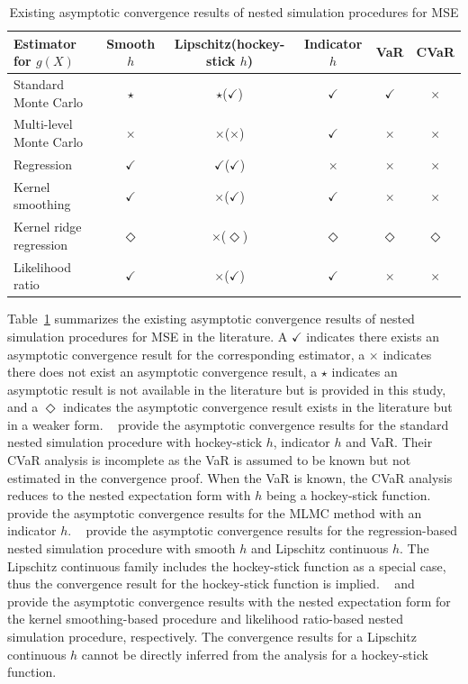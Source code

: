\begin{table}[ht]
    \centering
    \footnotesize
    \begin{tabular}{|l|c|c|c|c|c|}
    \hline
    \textbf{Estimator for} $g(X)$ & \textbf{Smooth} $h$ & \textbf{Lipschitz}(\textbf{hockey-stick} $h$) & \textbf{Indicator} $h$ & \textbf{VaR} & \textbf{CVaR} \\
    \hline
    Standard Monte Carlo & $\star$ & $\star$($\checkmark$) & $\checkmark$ & $\checkmark$ & $\times$ \\
    \hline
    Multi-level Monte Carlo & $\times$ & $\times$($\times$) & $\checkmark$ & $\times$ & $\times$ \\
    \hline
    Regression & $\checkmark$ & $\checkmark$($\checkmark$) & $\times$ & $\times$ & $\times$ \\
    \hline
    Kernel smoothing & $\checkmark$ & $\times$($\checkmark$) & $\checkmark$ & $\times$ & $\times$ \\
    \hline
    Kernel ridge regression & $\Diamond$ & $\times$($\Diamond$) & $\Diamond$ & $\Diamond$ & $\Diamond$ \\
    \hline
    Likelihood ratio & $\checkmark$ & $\times$($\checkmark$) & $\checkmark$ & $\times$ & $\times$ \\
    \hline
    \end{tabular}
    \caption{Existing asymptotic convergence results of nested simulation procedures for MSE}
    \label{tab1:asymConv-mse}
\end{table}


Table~\ref{tab1:asymConv-mse} summarizes the existing asymptotic convergence results of nested simulation procedures for MSE in the literature.
A $\checkmark$ indicates there exists an asymptotic convergence result for the corresponding estimator,
a $\times$ indicates there does not exist an asymptotic convergence result, 
a $\star$ indicates an asymptotic result is not available in the literature but is provided in this study, and
a $\Diamond$ indicates the asymptotic convergence result exists in the literature but in a weaker form.
~\cite{gordy2010nested} provide the asymptotic convergence results for the standard nested simulation procedure with hockey-stick $h$, indicator $h$ and VaR.
Their CVaR analysis is incomplete as the VaR is assumed to be known but not estimated in the convergence proof.
When the VaR is known, the CVaR analysis reduces to the nested expectation form with $h$ being a hockey-stick function.
~\cite{giles2019multilevel} provide the asymptotic convergence results for the MLMC method with an indicator $h$.
~\cite{broadie2015risk} provide the asymptotic convergence results for the regression-based nested simulation procedure with smooth $h$ and Lipschitz continuous $h$.
The Lipschitz continuous family includes the hockey-stick function as a special case, thus the convergence result for the hockey-stick function is implied.
~\cite{hong2017kernel} and~\cite{zhang2022sample} provide the asymptotic convergence results with the nested expectation form for the kernel smoothing-based procedure and likelihood ratio-based nested simulation procedure, respectively.
The convergence results for a Lipschitz continuous $h$ cannot be directly inferred from the analysis for a hockey-stick function.

